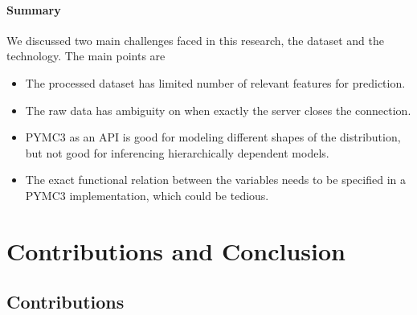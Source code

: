 \documentclass[]{article}
\begin{document}
\paragraph{Summary}

We discussed two main challenges faced in this research, the dataset and the technology. The main points are

\begin{itemize}
\item
The processed dataset has limited number of relevant features for prediction.
\item
The raw data has ambiguity on when exactly the server closes the connection. 
\item
PYMC3 as an API is good for modeling different shapes of the distribution, but not good for inferencing hierarchically dependent models.
\item
The exact functional relation between the variables needs to be specified in a PYMC3 implementation, which could be tedious.
\end{itemize}


\newpage
\section{Contributions and Conclusion}

\subsection{Contributions}
\end{document}
